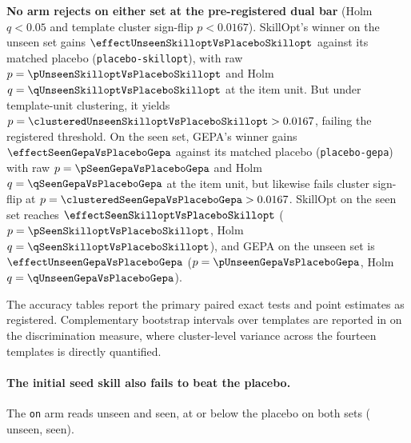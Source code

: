 
\textbf{No arm rejects on either set at the pre-registered dual bar}
(Holm $q < 0.05$ and template cluster sign-flip $p < 0.0167$).
SkillOpt's winner on the unseen set gains $\NUM{\effectUnseenSkilloptVsPlaceboSkillopt}$
against its matched placebo (\texttt{placebo-skillopt}), with raw
$p = \NUM{\pUnseenSkilloptVsPlaceboSkillopt}$ and Holm $q = \NUM{\qUnseenSkilloptVsPlaceboSkillopt}$
at the item unit. But under template-unit clustering, it yields
$p = \NUM{\clusteredUnseenSkilloptVsPlaceboSkillopt} > 0.0167$, failing the
registered threshold.
On the seen set, GEPA's winner gains $\NUM{\effectSeenGepaVsPlaceboGepa}$ against
its matched placebo (\texttt{placebo-gepa}) with raw $p = \NUM{\pSeenGepaVsPlaceboGepa}$
and Holm $q = \NUM{\qSeenGepaVsPlaceboGepa}$ at the item unit, but likewise fails
cluster sign-flip at $p = \NUM{\clusteredSeenGepaVsPlaceboGepa} > 0.0167$.
SkillOpt on the seen set reaches $\NUM{\effectSeenSkilloptVsPlaceboSkillopt}$
($p = \NUM{\pSeenSkilloptVsPlaceboSkillopt}$, Holm $q = \NUM{\qSeenSkilloptVsPlaceboSkillopt}$),
and GEPA on the unseen set is $\NUM{\effectUnseenGepaVsPlaceboGepa}$
($p = \NUM{\pUnseenGepaVsPlaceboGepa}$, Holm $q = \NUM{\qUnseenGepaVsPlaceboGepa}$).

The accuracy tables report the primary paired exact tests and point estimates
as registered. Complementary bootstrap intervals over templates are reported in
 on the discrimination measure, where cluster-level variance
across the fourteen templates is directly quantified.

\paragraph{The initial seed skill also fails to beat the placebo.} The
\texttt{on} arm reads \NUM{\accUnseenOn} unseen and \NUM{\accSeenOn} seen,
at or below the placebo on both sets (\NUM{\effectUnseenOn} unseen,
\NUM{\effectSeenOn} seen).

